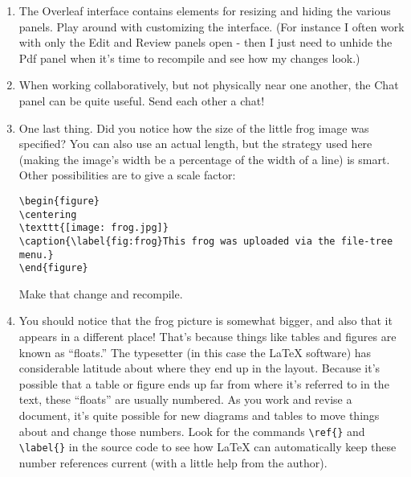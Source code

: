 \begin{enumerate}
\vfill 

\clearpage

\item The Overleaf interface contains elements for resizing and hiding the various panels.  Play around with customizing the interface.  (For instance I often work with only the Edit and Review panels open - then I just need to unhide the Pdf panel when it's time to recompile and see how my changes look.)

\vfill

\item When working collaboratively, but not physically near one another, the Chat panel can be quite useful.  Send each other a chat!

\vfill

\item One last thing.  Did you notice how the size of the little frog image was specified?  You can also use an actual length, but the strategy used here (making the image's width be a percentage of the width of a line) is smart.  Other possibilities are to give a scale factor:

\begin{codeblock}
\begin{verbatim}
\begin{figure}
\centering
\texttt{[image: frog.jpg]}
\caption{\label{fig:frog}This frog was uploaded via the file-tree menu.}
\end{figure}
\end{verbatim}
\end{codeblock}

Make that change and recompile.

\vfill

\item You should notice that the frog picture is somewhat bigger, and also that it appears in a different place!  That's because things like tables and figures are known as ``floats.''  The typesetter (in this case the \LaTeX{} software) has considerable latitude about where they end up in the layout.  Because it's possible that a table or figure ends up far from where it's referred to in the text, these ``floats'' are usually numbered.  As you work and revise a document, it's quite possible for new diagrams and tables to move things about and change those numbers.  Look for the commands \verb+\ref{}+ and \verb+\label{}+ in the source code to see how \LaTeX{} can automatically keep these number references current (with a little help from the author).


\end{enumerate}

